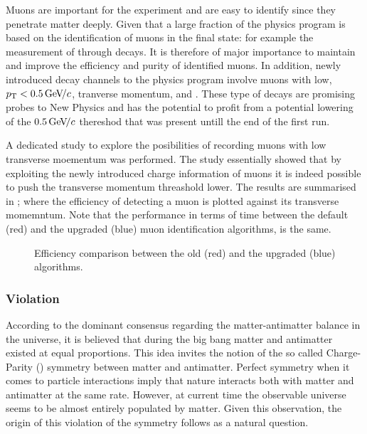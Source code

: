 Muons are important for the \lhcb experiment and are easy to identify since they penetrate matter deeply.
Given that a large fraction of the \lhcb physics program is based on the identification of muons in the
final state: for example the measurement of \phis through \BsJpsiPhi decays. It is therefore of major
importance to maintain and improve the efficiency and purity of identified muons. In addition, newly
introduced decay channels to the \lhcb physics program involve muons with low, $\mbox{$p_{\rm T}$} < 0.5 {\mathrm{\,Ge\kern -0.1em V\!/}c}$,
tranverse momentum, \eg \Sigmapmumu \cite{LHCB-CONF-2016-013-001} and \Ksmumu \cite{LHCb-CONF-2016-012}.
These type of decays are promising probes to New Physics and \lhcb has the potential to profit from a
potential lowering of the $0.5 {\mathrm{\,Ge\kern -0.1em V\!/}c}$ thereshod that was present untill the end of the first \lhc run.


A dedicated study to explore the posibilities of recording muons with low transverse
moementum was performed. The study essentially showed that by exploiting the newly introduced charge
information of muons it is indeed possible to push the transverse momentum threashold lower. The results
are summarised in ; where the efficiency of detecting a muon is plotted against its transverse
momemntum. Note that the performance in terms of time between the default (red) and the upgraded (blue)
muon identification algorithms, is the same.

\begin{figure}[t]
  \begin{subfigure}{0.5\textwidth}
    \raggedright
    \scalebox{.6}{}
    \label{app_eff_pt_zoom_comp}
  \end{subfigure}%
  \hfill
  \begin{subfigure}{0.5\textwidth}
    \raggedleft
    \scalebox{.6}{}
    \label{app_eff_p_comp}
  \end{subfigure}
    \caption{Efficiency comparison between the old (red) and the upgraded (blue) algorithms.}
  \label{app_eff_comp}
\end{figure}


\subsubsection{\CP Violation}
According to the dominant consensus regarding the matter-antimatter balance in the
universe, it is believed that during the big bang matter and antimatter existed at
equal proportions. This idea invites the notion of the so called Charge-Parity (\CP)
symmetry between matter and antimatter. Perfect \CP symmetry when it comes to particle
interactions imply that nature interacts both with matter and antimatter at the same rate.
However, at current time the observable universe seems to be almost entirely populated by
matter. Given this observation, the origin of this violation of the \CP symmetry follows
as a natural question.

